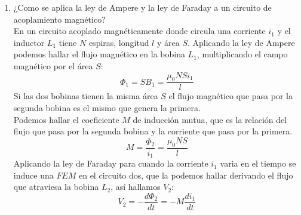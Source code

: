 \documentclass[twocolumn]{IEEEtran}
\begin{document}
\begin{enumerate}
 \item ¿Como se aplica la ley de Ampere y la ley de Faraday a un circuito de acoplamiento magnético?\\
En un circuito acoplado magnéticamente donde circula una corriente $i_1$ y el inductor $L_1$ tiene $N$ espiras, longitud $l$ y área $S$. Aplicando la ley de Ampere podemos hallar el flujo magnético en la bobina $L_1$, multiplicando el campo magnético por el área $S$:
\begin{equation}
{\Phi _1} = S{B_1} = \frac{{{\mu _0}NS{i_1}}}{l}
\label{equ5}
\end{equation}
\noindent
Si las dos bobinas tienen la misma área $S$ el flujo magnético que pasa por la segunda bobina es el mismo que genera la primera.\\
Podemos hallar el coeficiente $M$ de inducción mutua, que es la relación del flujo que pasa por la segunda bobina y la corriente que pasa por la primera.
\begin{equation}
 M = \frac{{{\Phi _2}}}{{{i_1}}} = \frac{{{\mu _0}NS}}{l}
\label{equ6}
\end{equation}
\noindent
Aplicando la ley de Faraday para cuando la corriente $i_1$ varia en el tiempo se induce una $FEM$ en el circuito dos, que la podemos hallar derivando el flujo que atraviesa la bobina $L_2$, así hallamos $V_2$:
\begin{equation}
 {V_2} =  - \frac{{d{\Phi _2}}}{{dt}} =  - M\frac{{d{i_1}}}{{dt}}
\label{equ7}
\end{equation}


\end{enumerate}
\end{document}
